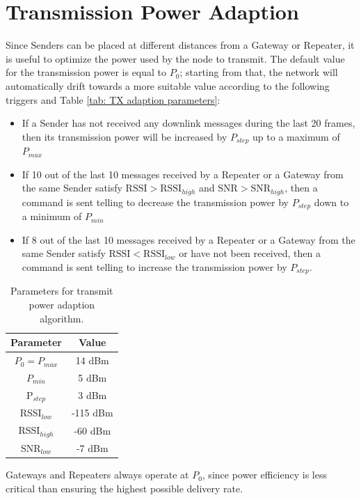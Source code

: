 \section{Transmission Power Adaption}
\label{sec: transmission power adaption}
Since Senders can be placed at different distances from a Gateway or Repeater, it is useful to optimize the power
used by the node to transmit. The default value for the transmission power is equal to $P_{0}$; starting from that, the
network will automatically drift towards a more suitable value according to the following triggers and Table \ref{tab:
TX adaption parameters}:
\begin{itemize}
    \item If a Sender has not received any downlink messages during
        the last 20 frames, then its transmission power will be increased by $P_{step}$ up to a maximum of $P_{max}$
    \item If 10 out of the last 10 messages received by a Repeater or a Gateway from the same Sender
        satisfy $\text{RSSI} > \text{RSSI}_{high}$ and $\text{SNR} > \text{SNR}_{high}$, then
        a command is sent telling to decrease the transmission power by $P_{step}$ down to a minimum of
        $P_{min}$
    \item If 8 out of the last 10 messages received by a Repeater or a Gateway from the same Sender
        satisfy $\text{RSSI} < \text{RSSI}_{low}$ or have not been received, then a command is sent telling to
        increase the transmission power by $P_{step}$.
\end{itemize}

\begin{table}[ht]
    \caption{Parameters for transmit power adaption algorithm.}
    \label{tab: TX adaption parameters}
    \centering
    \begin{tabular}{ |c|c| }
        \hline
        \textbf{Parameter} & \textbf{Value}\\
        \hline
        $P_{0} = P_{max}$ & 14 dBm\\
        \hline
        $P_{min}$ & 5 dBm\\
        \hline
        P$_{step}$ & 3 dBm\\
        \hline
        RSSI$_{low}$ & -115 dBm\\
        \hline
        RSSI$_{high}$ & -60 dBm\\
        \hline
        SNR$_{low}$ & -7 dBm\\
        \hline
    \end{tabular}
\end{table}
Gateways and Repeaters always operate at $P_{0}$, since power efficiency is less critical than ensuring the highest
possible delivery rate.


